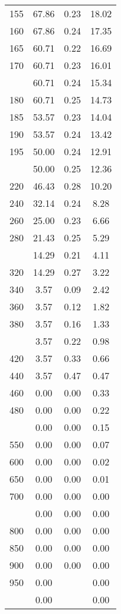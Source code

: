 \begin{table}[ht]
\begin{tabular}{lccc}
  155 & 67.86 & 0.23 & 18.02 \\ 
  160 & 67.86 & 0.24 & 17.35 \\ 
  165 & 60.71 & 0.22 & 16.69 \\ 
  170 & 60.71 & 0.23 & 16.01 \\ 
   \addlinespace
175 & 60.71 & 0.24 & 15.34 \\ 
  180 & 60.71 & 0.25 & 14.73 \\ 
  185 & 53.57 & 0.23 & 14.04 \\ 
  190 & 53.57 & 0.24 & 13.42 \\ 
  195 & 50.00 & 0.24 & 12.91 \\ 
   \addlinespace
200 & 50.00 & 0.25 & 12.36 \\ 
  220 & 46.43 & 0.28 & 10.20 \\ 
  240 & 32.14 & 0.24 & 8.28 \\ 
  260 & 25.00 & 0.23 & 6.66 \\ 
  280 & 21.43 & 0.25 & 5.29 \\ 
   \addlinespace
300 & 14.29 & 0.21 & 4.11 \\ 
  320 & 14.29 & 0.27 & 3.22 \\ 
  340 & 3.57 & 0.09 & 2.42 \\ 
  360 & 3.57 & 0.12 & 1.82 \\ 
  380 & 3.57 & 0.16 & 1.33 \\ 
   \addlinespace
400 & 3.57 & 0.22 & 0.98 \\ 
  420 & 3.57 & 0.33 & 0.66 \\ 
  440 & 3.57 & 0.47 & 0.47 \\ 
  460 & 0.00 & 0.00 & 0.33 \\ 
  480 & 0.00 & 0.00 & 0.22 \\ 
   \addlinespace
500 & 0.00 & 0.00 & 0.15 \\ 
  550 & 0.00 & 0.00 & 0.07 \\ 
  600 & 0.00 & 0.00 & 0.02 \\ 
  650 & 0.00 & 0.00 & 0.01 \\ 
  700 & 0.00 & 0.00 & 0.00 \\ 
   \addlinespace
750 & 0.00 & 0.00 & 0.00 \\ 
  800 & 0.00 & 0.00 & 0.00 \\ 
  850 & 0.00 & 0.00 & 0.00 \\ 
  900 & 0.00 & 0.00 & 0.00 \\ 
  950 & 0.00 &  & 0.00 \\ 
   \addlinespace
1000 & 0.00 &  & 0.00 \\ 
   \bottomrule
\end{tabular}
\end{table}
